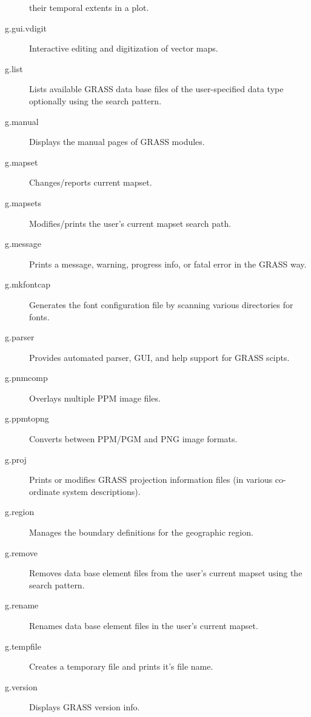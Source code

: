 \begin{description}
their temporal extents in a plot.
\item [{g.gui.vdigit}] Interactive editing and digitization of vector maps.
\item [{g.list}] Lists available GRASS data base files of the user-specified
data type optionally using the search pattern.
\item [{g.manual}] Displays the manual pages of GRASS modules.
\item [{g.mapset}] Changes/reports current mapset.
\item [{g.mapsets}] Modifies/prints the user's current mapset search path.
\item [{g.message}] Prints a message, warning, progress info, or fatal
error in the GRASS way.
\item [{g.mkfontcap}] Generates the font configuration file by scanning
various directories for fonts.
\item [{g.parser}] Provides automated parser, GUI, and help support for
GRASS scipts.
\item [{g.pnmcomp}] Overlays multiple PPM image files.
\item [{g.ppmtopng}] Converts between PPM/PGM and PNG image formats.
\item [{g.proj}] Prints or modifies GRASS projection information files
(in various co-ordinate system descriptions).
\item [{g.region}] Manages the boundary definitions for the geographic
region.
\item [{g.remove}] Removes data base element files from the user's current
mapset using the search pattern.
\item [{g.rename}] Renames data base element files in the user's current
mapset.
\item [{g.tempfile}] Creates a temporary file and prints it's file name.
\item [{g.version}] Displays GRASS version info.\end{description}

